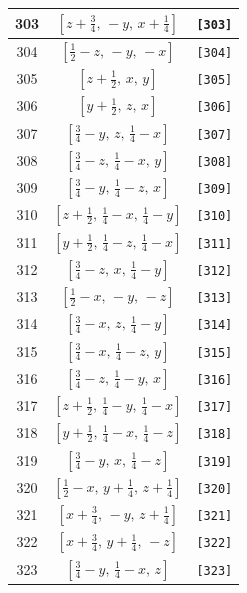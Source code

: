 \documentclass[fleqn,8pt]{jsarticle}
\begin{document}
\begin{longtable}{ccc}
303 & $\left[ z + \frac{3}{4},\, - y,\, x + \frac{1}{4} \right]$ & {\tt [303]} \\ \hline
304 & $\left[ \frac{1}{2} - z,\, - y,\, - x \right]$ & {\tt [304]} \\ \hline
305 & $\left[ z + \frac{1}{2},\, x,\, y \right]$ & {\tt [305]} \\ \hline
306 & $\left[ y + \frac{1}{2},\, z,\, x \right]$ & {\tt [306]} \\ \hline
307 & $\left[ \frac{3}{4} - y,\, z,\, \frac{1}{4} - x \right]$ & {\tt [307]} \\ \hline
308 & $\left[ \frac{3}{4} - z,\, \frac{1}{4} - x,\, y \right]$ & {\tt [308]} \\ \hline
309 & $\left[ \frac{3}{4} - y,\, \frac{1}{4} - z,\, x \right]$ & {\tt [309]} \\ \hline
310 & $\left[ z + \frac{1}{2},\, \frac{1}{4} - x,\, \frac{1}{4} - y \right]$ & {\tt [310]} \\ \hline
311 & $\left[ y + \frac{1}{2},\, \frac{1}{4} - z,\, \frac{1}{4} - x \right]$ & {\tt [311]} \\ \hline
312 & $\left[ \frac{3}{4} - z,\, x,\, \frac{1}{4} - y \right]$ & {\tt [312]} \\ \hline
313 & $\left[ \frac{1}{2} - x,\, - y,\, - z \right]$ & {\tt [313]} \\ \hline
314 & $\left[ \frac{3}{4} - x,\, z,\, \frac{1}{4} - y \right]$ & {\tt [314]} \\ \hline
315 & $\left[ \frac{3}{4} - x,\, \frac{1}{4} - z,\, y \right]$ & {\tt [315]} \\ \hline
316 & $\left[ \frac{3}{4} - z,\, \frac{1}{4} - y,\, x \right]$ & {\tt [316]} \\ \hline
317 & $\left[ z + \frac{1}{2},\, \frac{1}{4} - y,\, \frac{1}{4} - x \right]$ & {\tt [317]} \\ \hline
318 & $\left[ y + \frac{1}{2},\, \frac{1}{4} - x,\, \frac{1}{4} - z \right]$ & {\tt [318]} \\ \hline
319 & $\left[ \frac{3}{4} - y,\, x,\, \frac{1}{4} - z \right]$ & {\tt [319]} \\ \hline
320 & $\left[ \frac{1}{2} - x,\, y + \frac{1}{4},\, z + \frac{1}{4} \right]$ & {\tt [320]} \\ \hline
321 & $\left[ x + \frac{3}{4},\, - y,\, z + \frac{1}{4} \right]$ & {\tt [321]} \\ \hline
322 & $\left[ x + \frac{3}{4},\, y + \frac{1}{4},\, - z \right]$ & {\tt [322]} \\ \hline
323 & $\left[ \frac{3}{4} - y,\, \frac{1}{4} - x,\, z \right]$ & {\tt [323]} \\ \hline

\end{longtable}
\end{document}
